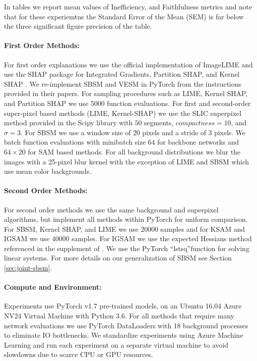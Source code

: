 \documentclass{article} %
\begin{document}
In tables we report mean values of Inefficiency, and Faithfulness metrics and note that for these experiemtns the Standard Error of the Mean (SEM) is far below the three significant figure precision of the table.


\paragraph{First Order Methods:} For first order explanations we use the official implementation of ImageLIME \citep{lime-github} and use the SHAP package for Integrated Gradients, Partition SHAP, and Kernel SHAP \citep{partition-shap}. We re-implement SBSM and VESM in PyTorch from the instructions provided in their papers. For sampling procedures such as LIME, Kernel SHAP, and Partition SHAP we use 5000 function evaluations. For first and second-order super-pixel based methods (LIME, Kernel-SHAP) we use the SLIC superpixel method \citep{achanta2010slic} provided in the Scipy library \citep{scipy} with $50$ segments, $compactness=10$, and $\sigma=3$. For SBSM we use a window size of $20$ pixels and a stride of $3$ pixels. We batch function evaluations with minibatch size $64$ for backbone networks and $64 \times 20$ for SAM based methods. For all background distributions we blur the images with a 25-pixel blur kernel with the exception of LIME and SBSM which use mean color backgrounds. 

\paragraph{Second Order Methods:} For second order methods we use the same background and superpixel algorithms, but implement all methods within PyTorch for uniform comparison. For SBSM, Kernel SHAP, and LIME we use $20000$ samples and for KSAM and IGSAM we use $40000$ samples. For IGSAM we use the expected Hessians method referenced in the supplement of \cite{integrated-hessians}. We use the PyTorch ``lstsq''function for solving linear systems. For more details on our generalization of SBSM see Section \ref{sec:joint-sbsm}.

\paragraph{Compute and Environment:} Experiments use PyTorch \citep{pytorch} v1.7 pre-trained models, on an Ubuntu 16.04 Azure NV24 Virtual Machine with Python 3.6. For all methods that require many network evaluations we use PyTorch DataLoaders with 18 background processes to eliminate IO bottlenecks. We standardize experiments using Azure Machine Learning and run each experiment on a separate virtual machine to avoid slowdowns due to scarce CPU or GPU resources.
\end{document}
